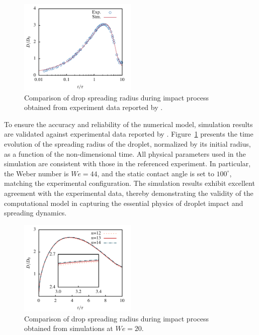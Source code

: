 \documentclass[lineno]{cls/jfm}
\begin{document}
 \begin{figure}
  \centerline{\includegraphics[width=0.5\textwidth]{fig/Verity.pdf}}
  \caption{Comparison of drop spreading radius during impact process obtained from experiment data reported by \cite{sikalo_analysis_2002}.}
 \label{fig:verity}
 \end{figure}


To ensure the accuracy and reliability of the numerical model, simulation results are validated against experimental data reported by \citet{sikalo_analysis_2002}. Figure~\ref{fig:verity} presents the time evolution of the spreading radius of the droplet, normalized by its initial radius, as a function of the non-dimensional time. All physical parameters used in the simulation are consistent with those in the referenced experiment. In particular, the Weber number is $We = 44$, and the static contact angle is set to $100^\circ$, matching the experimental configuration. The simulation results exhibit excellent agreement with the experimental data, thereby demonstrating the validity of the computational model in capturing the essential physics of droplet impact and spreading dynamics.

 \begin{figure}
  \centerline{\includegraphics[width=0.5\textwidth]{fig/mesh.pdf}}
  \caption{Comparison of drop spreading radius during impact process obtained from simulations at $We=20$.}
 \label{fig:mesh}
 \end{figure}
\end{document}
